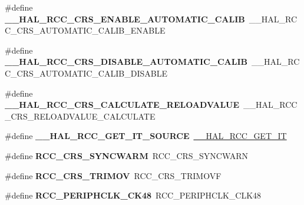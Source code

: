 \begin{DoxyCompactItemize}
\#define {\bfseries \+\_\+\+\_\+\+H\+A\+L\+\_\+\+R\+C\+C\+\_\+\+C\+R\+S\+\_\+\+E\+N\+A\+B\+L\+E\+\_\+\+A\+U\+T\+O\+M\+A\+T\+I\+C\+\_\+\+C\+A\+L\+IB}~\+\_\+\+\_\+\+H\+A\+L\+\_\+\+R\+C\+C\+\_\+\+C\+R\+S\+\_\+\+A\+U\+T\+O\+M\+A\+T\+I\+C\+\_\+\+C\+A\+L\+I\+B\+\_\+\+E\+N\+A\+B\+LE
\item 
\mbox{\label{group___h_a_l___r_c_c___aliased_ga1a09d18c05bd1f6fbbd78ffaecc3d96f}} 
\#define {\bfseries \+\_\+\+\_\+\+H\+A\+L\+\_\+\+R\+C\+C\+\_\+\+C\+R\+S\+\_\+\+D\+I\+S\+A\+B\+L\+E\+\_\+\+A\+U\+T\+O\+M\+A\+T\+I\+C\+\_\+\+C\+A\+L\+IB}~\+\_\+\+\_\+\+H\+A\+L\+\_\+\+R\+C\+C\+\_\+\+C\+R\+S\+\_\+\+A\+U\+T\+O\+M\+A\+T\+I\+C\+\_\+\+C\+A\+L\+I\+B\+\_\+\+D\+I\+S\+A\+B\+LE
\item 
\mbox{\label{group___h_a_l___r_c_c___aliased_ga116f9acbd5f6b61002ea1a6d3b17fdcd}} 
\#define {\bfseries \+\_\+\+\_\+\+H\+A\+L\+\_\+\+R\+C\+C\+\_\+\+C\+R\+S\+\_\+\+C\+A\+L\+C\+U\+L\+A\+T\+E\+\_\+\+R\+E\+L\+O\+A\+D\+V\+A\+L\+UE}~\+\_\+\+\_\+\+H\+A\+L\+\_\+\+R\+C\+C\+\_\+\+C\+R\+S\+\_\+\+R\+E\+L\+O\+A\+D\+V\+A\+L\+U\+E\+\_\+\+C\+A\+L\+C\+U\+L\+A\+TE
\item 
\mbox{\label{group___h_a_l___r_c_c___aliased_gabfda03424b7b180eec4bad4bf9c76799}} 
\#define {\bfseries \+\_\+\+\_\+\+H\+A\+L\+\_\+\+R\+C\+C\+\_\+\+G\+E\+T\+\_\+\+I\+T\+\_\+\+S\+O\+U\+R\+CE}~\hyperlink{group___r_c_c___flags___interrupts___management_ga134af980b892f362c05ae21922cd828d}{\+\_\+\+\_\+\+H\+A\+L\+\_\+\+R\+C\+C\+\_\+\+G\+E\+T\+\_\+\+IT}
\item 
\mbox{\label{group___h_a_l___r_c_c___aliased_ga891dba525c7131dc45cd727be5964a98}} 
\#define {\bfseries R\+C\+C\+\_\+\+C\+R\+S\+\_\+\+S\+Y\+N\+C\+W\+A\+RM}~R\+C\+C\+\_\+\+C\+R\+S\+\_\+\+S\+Y\+N\+C\+W\+A\+RN
\item 
\mbox{\label{group___h_a_l___r_c_c___aliased_ga52aafca9877f3acfca85b91fca0d0ac4}} 
\#define {\bfseries R\+C\+C\+\_\+\+C\+R\+S\+\_\+\+T\+R\+I\+M\+OV}~R\+C\+C\+\_\+\+C\+R\+S\+\_\+\+T\+R\+I\+M\+O\+VF
\item 
\mbox{\label{group___h_a_l___r_c_c___aliased_ga3ee6866f9d2349cd1a099407d2a7664b}} 
\#define {\bfseries R\+C\+C\+\_\+\+P\+E\+R\+I\+P\+H\+C\+L\+K\+\_\+\+C\+K48}~R\+C\+C\+\_\+\+P\+E\+R\+I\+P\+H\+C\+L\+K\+\_\+\+C\+L\+K48

\end{DoxyCompactItemize}
